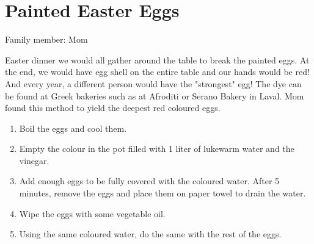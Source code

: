 \chapter{Painted Easter Eggs}
\label{ch:eastereggs}


Family member: Mom


 Easter dinner we would all gather around the table to break the painted eggs. At the end, we would have egg shell on the entire table and our hands would be red! And every year, a different person would have the "strongest" egg!     The dye can be found at Greek bakeries such as at Afroditi or Serano Bakery in Laval. Mom found this method to yield the deepest red coloured eggs.

\begin{enumerate}
    \item Boil the eggs and cool them.
    \item Empty the colour in the pot filled with 1 liter of lukewarm water and the vinegar.
    \item Add enough eggs to be fully covered with the coloured water. After 5 minutes, remove the eggs and place them on paper towel to drain the water.
    \item Wipe the eggs with some vegetable oil.
    \item Using the same coloured water, do the same with the rest of the eggs.
\end{enumerate}


